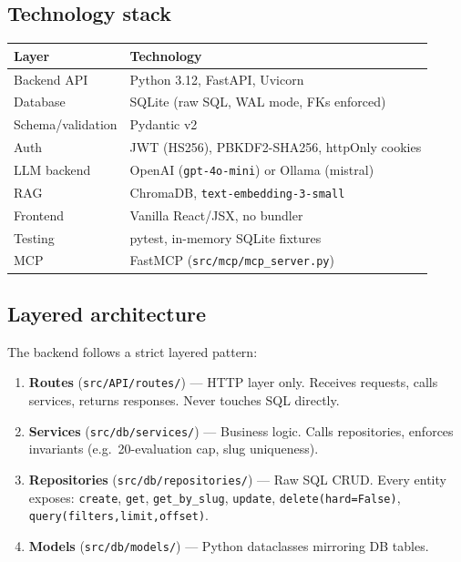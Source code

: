 \documentclass[12pt,a4paper]{article}
\begin{document}
\subsection{Technology stack}

\begin{tabular}{@{}ll@{}}
\toprule
\textbf{Layer} & \textbf{Technology} \\
\midrule
Backend API      & Python 3.12, FastAPI, Uvicorn \\
Database         & SQLite (raw SQL, WAL mode, FKs enforced) \\
Schema/validation & Pydantic v2 \\
Auth             & JWT (HS256), PBKDF2-SHA256, httpOnly cookies \\
LLM backend      & OpenAI (\texttt{gpt-4o-mini}) or Ollama (mistral) \\
RAG              & ChromaDB, \texttt{text-embedding-3-small} \\
Frontend         & Vanilla React/JSX, no bundler \\
Testing          & pytest, in-memory SQLite fixtures \\
MCP              & FastMCP (\texttt{src/mcp/mcp\_server.py}) \\
\bottomrule
\end{tabular}

\subsection{Layered architecture}

The backend follows a strict layered pattern:

\begin{enumerate}
  \item \textbf{Routes} (\texttt{src/API/routes/}) --- HTTP layer only. Receives requests,
        calls services, returns responses. Never touches SQL directly.
  \item \textbf{Services} (\texttt{src/db/services/}) --- Business logic. Calls repositories,
        enforces invariants (e.g.\ 20-evaluation cap, slug uniqueness).
  \item \textbf{Repositories} (\texttt{src/db/repositories/}) --- Raw SQL CRUD.
        Every entity exposes: \texttt{create}, \texttt{get}, \texttt{get\_by\_slug},
        \texttt{update}, \texttt{delete(hard=False)},
        \texttt{query(filters,limit,offset)}.
  \item \textbf{Models} (\texttt{src/db/models/}) --- Python dataclasses mirroring DB tables.
\end{enumerate}
\end{document}
